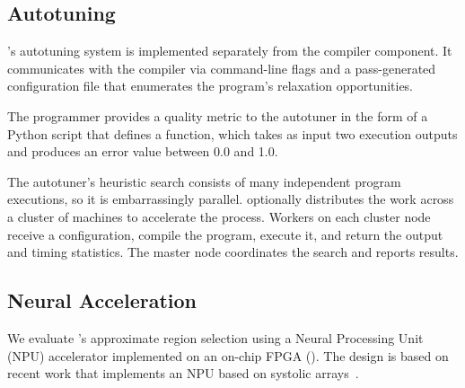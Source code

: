\subsection{Autotuning}

\sysname's autotuning system is implemented separately
from the compiler component. It communicates with the compiler via
command-line flags and a pass-generated configuration file that enumerates the
program's relaxation opportunities.

The programmer provides a quality metric to the autotuner in the form of a Python script that
defines a  function, which
takes as input two execution outputs and
produces an error value between 0.0 and 1.0.

The autotuner's heuristic search consists of many independent program
executions, so it is embarrassingly parallel.
\sysname
optionally distributes the work across a cluster of machines to accelerate the
process.  Workers on each cluster node receive a configuration, compile the
program, execute it, and return the output and timing statistics. The master
node coordinates the search and reports results.

\subsection{Neural Acceleration}
\label{accept:sec:accelerator}

We evaluate \sysname's approximate region selection using a Neural Processing
Unit (NPU) accelerator implemented on an on-chip FPGA ().  The
design is based on recent work that implements an NPU based on systolic
arrays~\cite{npu, snnap}.
